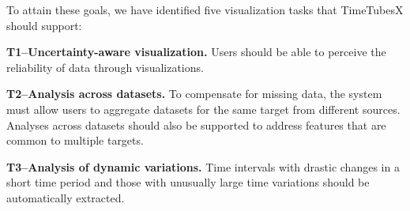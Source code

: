 
To attain these goals, we have identified five visualization tasks that TimeTubesX should support:

\noindent\textbf{T1--Uncertainty-aware visualization.} 
Users should be able to perceive the reliability of data through visualizations. 

\noindent\textbf{T2--Analysis across datasets.} 
To compensate for missing data, 
the system must allow users to aggregate datasets for the same target from different sources.
Analyses across datasets should also be supported to address features that are common to multiple targets.

\noindent\textbf{T3--Analysis of dynamic variations.} 
Time intervals with drastic changes in a short time period and those with unusually large time variations should be automatically extracted.

